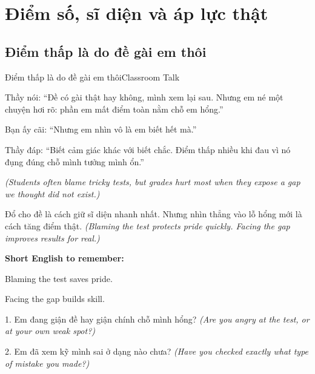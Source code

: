 \chapter{Điểm số, sĩ diện và áp lực thật}

\section{Điểm thấp là do đề gài em thôi}
\begin{truyen}{Điểm thấp là do đề gài em thôi}{Classroom Talk}

Thầy nói: ``Đề có gài thật hay không, mình xem lại sau. Nhưng em né một chuyện hơi rõ: phần em mất điểm toàn nằm chỗ em hổng.''

Bạn ấy cãi: ``Nhưng em nhìn vô là em biết hết mà.''

Thầy đáp: ``Biết cảm giác khác với biết chắc. Điểm thấp nhiều khi đau vì nó đụng đúng chỗ mình tưởng mình ổn.''

\textit{(Students often blame tricky tests, but grades hurt most when they expose a gap we thought did not exist.)}
\end{truyen}

\begin{baihoc}
Đổ cho đề là cách giữ sĩ diện nhanh nhất. Nhưng nhìn thẳng vào lỗ hổng mới là cách tăng điểm thật.
\textit{(Blaming the test protects pride quickly. Facing the gap improves results for real.)}
\end{baihoc}

\begin{ghinhoanh}
\textbf{Short English to remember:}

Blaming the test saves pride.

Facing the gap builds skill.
\end{ghinhoanh}

\begin{tuhocnhanh}
1. Em đang giận đề hay giận chính chỗ mình hổng? \textit{(Are you angry at the test, or at your own weak spot?)}

2. Em đã xem kỹ mình sai ở dạng nào chưa? \textit{(Have you checked exactly what type of mistake you made?)}
\end{tuhocnhanh}
\ngancach

